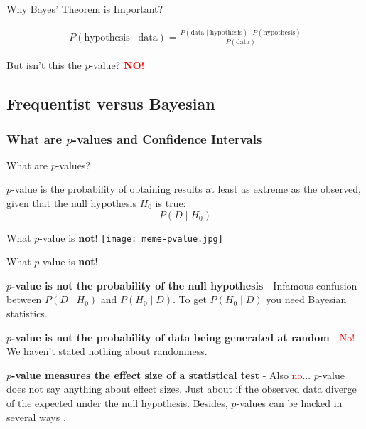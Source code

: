 \begin{frame}{Why Bayes' Theorem is Important?}
	\begin{idea}
		$$
			\begin{aligned}
				P(\text{hypothesis} \mid \text{data}) = \frac{P(\text{data} \mid \text{hypothesis}) \cdot P(\text{hypothesis})}{P(\text{data})}
			\end{aligned}
		$$
	\end{idea}
	But isn't this the $p$-value? \textcolor{red}{\textbf{NO!}}
\end{frame}

\subsection{Frequentist versus Bayesian}
\subsubsection{What are $p$-values and Confidence Intervals}
\begin{frame}{What are $p$-values?}
	\begin{defn}[$p$-value]
		$p$-value is the probability of obtaining results at least as
		extreme as the observed,
		given that the null hypothesis $H_0$ is true:
		$$P(D \mid H_0)$$
	\end{defn}
\end{frame}

\begin{frame}{What $p$-value is \textbf{not}!}
	\centering
	\texttt{[image: meme-pvalue.jpg]}
\end{frame}

\begin{frame}{What $p$-value is \textbf{not}!}
	\begin{vfilleditems}
		\item \textbf{$p$-value is not the probability of the null hypothesis}
		- Infamous confusion between $P(D \mid H_0)$ and $P(H_0 \mid D)$.
		To get $P(H_0 \mid D)$ you need Bayesian statistics.
		\item \textbf{$p$-value is not the probability of data being generated at random}
		- \textcolor{red}{No!} We haven't stated nothing about randomness.
		\item \textbf{$p$-value measures the effect size of a statistical test}
		- Also \textcolor{red}{no}... $p$-value does not say anything about effect sizes.
		Just about if the observed data diverge of the expected under the null hypothesis.
		Besides, $p$-values can be hacked in several ways \parencite{head2015extent}.
	\end{vfilleditems}
\end{frame}

